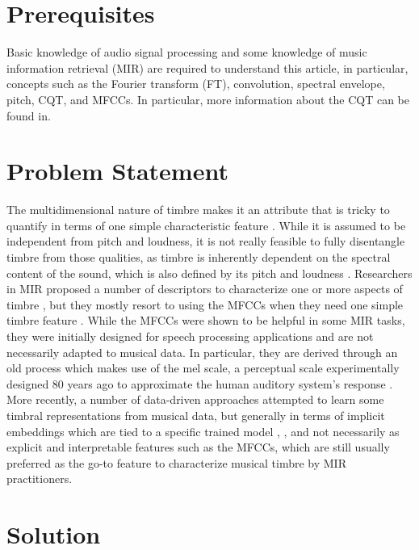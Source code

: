\documentclass[journal]{IEEEtran}
\begin{document}
\section{Prerequisites}

Basic knowledge of audio signal processing and some knowledge of music information retrieval (MIR) \cite{mueller2007} are required to understand this article, in particular, concepts such as the Fourier transform (FT), convolution, spectral envelope, pitch, CQT, and MFCCs. In particular, more information about the CQT can be found in\cite{brown1991, brown1992}.


\section{Problem Statement}

The multidimensional nature of timbre makes it an attribute that is tricky to quantify in terms of one simple characteristic feature \cite{grey1977}. While it is assumed to be independent from pitch and loudness, it is not really feasible to fully disentangle timbre from those qualities, as timbre is inherently dependent on the spectral content of the sound, which is also defined by its pitch and loudness \cite{moore2004}. Researchers in MIR proposed a number of descriptors to characterize one or more aspects of timbre \cite{peeters2011}, but they mostly resort to using the MFCCs when they need one simple timbre feature \cite{mueller2007}. While the MFCCs were shown to be helpful in some MIR tasks, they were initially designed for speech processing applications \cite{mermelstein1976} and are not necessarily adapted to musical data. In particular, they are derived through an old process which makes use of the mel scale, a perceptual scale experimentally designed 80 years ago to approximate the human auditory system's response \cite{stevens1937}. More recently, a number of data-driven approaches attempted to learn some timbral representations from musical data, but generally in terms of implicit embeddings which are tied to a specific trained model \cite{engel2017}, \cite{pons2017}, and not necessarily as explicit and interpretable features such as the MFCCs, which are still usually preferred as the go-to feature to characterize musical timbre by MIR practitioners.


\section{Solution}
\end{document}
